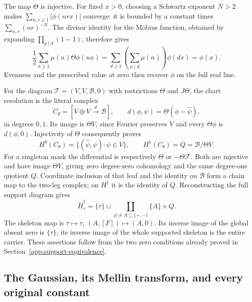 The map \(\Theta\) is injective. For fixed \(x>0\), choosing
a Schwartz exponent \(N>2\) makes
\(\sum_{n,r\ge1}|\phi(nrx)|\) converge: it is bounded by a
constant times \(\sum_{n,r}(nr)^{-N}\).
The divisor identity for the Möbius function, obtained by
expanding \(\prod_{p\mid d}(1-1)\), therefore gives
\[
\frac12\sum_{n\ge1}\mu(n)\Theta\phi(nx)
=\sum_{d\ge1}\left(\sum_{n\mid d}\mu(n)\right)\phi(dx)
=\phi(x).
\]
Evenness and the prescribed value at zero then recover
\(\phi\) on the full real line.

For the diagram
\(\mathcal T=(V,V,\mathscr B,0)\) with restrictions
\(\Theta\) and \(J\Theta\), the chart resolution is the
literal complex
\[
C_\theta=[V\oplus V\xrightarrow{d}\mathscr B],\qquad
d(\phi,\psi)=\Theta(\phi-\widehat\psi),
\]
in degrees \(0,1\). Its image is \(\Theta V\), since
Fourier preserves \(V\) and every \(\Theta\phi\) is
\(d(\phi,0)\). Injectivity of \(\Theta\) consequently proves
\[
H^0(C_\theta)=\{(\widehat\psi,\psi):\psi\in V\},
\qquad H^1(C_\theta)=Q=\mathscr B/\Theta V.
\]
For a singleton mask the differential is respectively
\(\Theta\) or \(-\Theta\mathcal F\). Both are injective
and have image \(\Theta V\), giving zero degree-zero
cohomology and the same degree-one quotient \(Q\).
Coordinate inclusion of that leaf and the identity on
\(\mathscr B\) form a chain map to the two-leg complex;
on \(H^1\) it is the identity of \(Q\). Reconstructing the
full support diagram gives
\[
\widetilde H^1_\tau
=\{\tau\}\sqcup
\coprod_{\varnothing\ne A\subseteq\{+,-\}}\{A\}\times Q.
\]
The skeleton map is
\(\tau\mapsto\tau\), \((A,[F])\mapsto(A,0)\).
Its inverse image of the global absent zero is
\(\{\tau\}\); its inverse image of the whole supported
skeleton is the entire carrier. These assertions follow
from the two zero conditions already proved in
Section~\ref{app:support-equivalence}.

\subsection{The Gaussian, its Mellin transform, and every original constant}
\label{app:gaussian-mellin}

